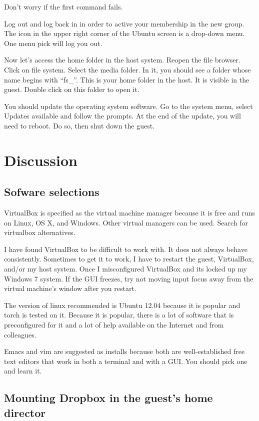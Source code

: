 \documentclass{article}
\begin{document}
Don't worry if the first command fails.


Log out and log back in in order to active your membership in the new
group. The icon in the upper right corner of the
Ubuntu screen is a drop-down menu. One menu pick will log you out.

Now let's access the home folder in the host system. Reopen the file
browser. Click on file system. Select the media folder. In it, you
should see a folder whose name begins with ``fs\_''. This is your home
folder in the host. It is visible in the guest. Double click on this
folder to open it. 

You should update the operating system software. Go to the system menu,
select Updates available and follow the prompts. At the end of the
update, you will need to reboot. Do so, then shut down the guest.



\section{Discussion}

\subsection{Sofware selections}

VirtualBox is specified as the virtual machine manager because it is
free and runs on Linux, OS X, and Windows. Other virtual managers can be
used. Search for virtualbox alternatives.

I have found VirtualBox to be difficult to work with. It does not always behave
consistently. Sometimes to get it to work, I have to restart the guest,
VirtualBox, and/or my host  system. Once I misconfigured VirtualBox and its
locked up my Windows 7 system. If the GUI freezes, try not moving input
focus away from the virtual machine's window after you restart.

The version of linux recommended is Ubuntu 12.04 because it is popular
and torch is tested on it. Because it is popular, there is a lot of
software that is preconfigured for it and a lot of help available on the
Internet and from colleagues. 

Emacs and vim are suggested as installs because both are
well-established free text editors that work in both a terminal and with
a GUI. You should pick one and learn it.


\subsection{Mounting Dropbox in the guest's home director}
\end{document}
